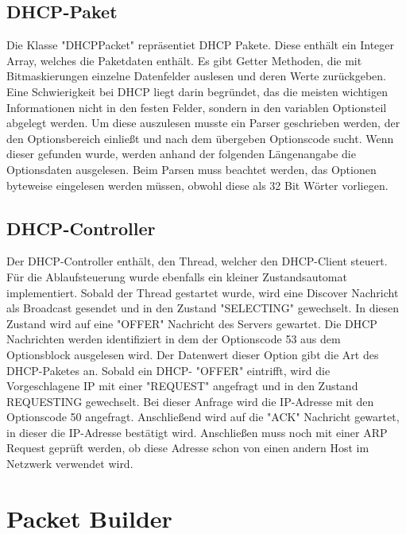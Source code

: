 \subsection{DHCP-Paket}
Die Klasse "DHCPPacket" repräsentiet DHCP Pakete. Diese enthält ein Integer Array, welches die Paketdaten enthält. Es gibt Getter Methoden, die mit Bitmaskierungen einzelne Datenfelder auslesen und deren Werte zurückgeben. Eine Schwierigkeit bei DHCP liegt darin begründet, das die meisten wichtigen Informationen nicht in den festen Felder, sondern in den variablen Optionsteil abgelegt werden. Um diese auszulesen musste ein Parser geschrieben werden, der den Optionsbereich einließt und nach dem übergeben Optionscode sucht. Wenn dieser gefunden wurde, werden anhand der folgenden Längenangabe die Optionsdaten ausgelesen. Beim Parsen muss beachtet werden, das Optionen byteweise eingelesen werden müssen, obwohl diese als 32 Bit Wörter vorliegen. 

\subsection{DHCP-Controller}

Der DHCP-Controller enthält, den Thread, welcher den DHCP-Client steuert. Für die Ablaufsteuerung wurde ebenfalls ein kleiner Zustandsautomat implementiert. Sobald der Thread gestartet wurde, wird eine Discover Nachricht als Broadcast gesendet und in den Zustand "SELECTING" gewechselt. In diesen Zustand wird auf eine {}"OFFER"{} Nachricht des Servers gewartet. Die DHCP Nachrichten werden identifiziert in dem der Optionscode 53 aus dem Optionsblock ausgelesen wird. Der Datenwert dieser Option gibt die Art des DHCP-Paketes an. Sobald ein DHCP- {}"OFFER"{} eintrifft, wird die Vorgeschlagene IP mit einer "REQUEST" angefragt und in den Zustand REQUESTING gewechselt. Bei dieser Anfrage wird die IP-Adresse mit den Optionscode 50 angefragt. Anschließend wird auf die "ACK" Nachricht gewartet, in dieser die IP-Adresse bestätigt wird. Anschließen muss noch mit einer ARP Request geprüft werden, ob diese Adresse schon von einen andern Host im Netzwerk verwendet wird. 

\section{Packet Builder}

